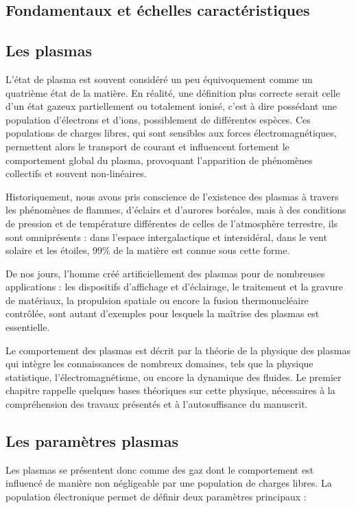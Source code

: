 \label{Introduction}
\begin{refsection}

\section{Fondamentaux et échelles caractéristiques}
\subsection{Les plasmas}
L'état de plasma est souvent considéré un peu équivoquement comme
un quatrième état de la matière. En réalité, une définition plus correcte serait
celle d'un état gazeux partiellement ou totalement ionisé, c'est à dire
possédant une population d'électrons et d'ions, possiblement de différentes
espèces. Ces populations de charges libres, qui sont sensibles aux forces
électromagnétiques, permettent alors le transport de courant et influencent
fortement le comportement global du plasma, provoquant l'apparition de
phénomènes collectifs et souvent non-linéaires.

Historiquement, nous avons pris conscience de l'existence des plasmas à travers
les phénomènes de flammes, d'éclairs et d'aurores boréales, mais à des
conditions de pression et de température différentes de celles de l'atmosphère
terrestre, ils sont omniprésents : dans l'espace intergalactique et
intersidéral, dans le vent solaire et les étoiles, 99\% de la matière est connue
sous cette forme.

De nos jours, l'homme créé artificiellement des plasmas pour de nombreuses
applications : les dispositifs d'affichage et d'éclairage, le traitement et la
gravure de matériaux, la propulsion spatiale ou encore la fusion
thermonucléaire contrôlée, sont autant d'exemples pour lesquels la maîtrise des
plasmas est essentielle.

Le comportement des plasmas est décrit par la théorie de la physique des
plasmas qui intègre les connaissances de nombreux domaines, tels que la
physique statistique, l'électromagnétisme, ou encore la dynamique des fluides.
Le premier chapitre rappelle quelques bases théoriques sur cette physique,
nécessaires à la compréhension des travaux présentés et à l'autosuffisance du manuscrit.

\subsection{Les paramètres plasmas}
Les plasmas se présentent donc comme des gaz dont le comportement est influencé
de manière non négligeable par une population de charges libres.
La population électronique permet de définir deux paramètres principaux :


\end{refsection}
